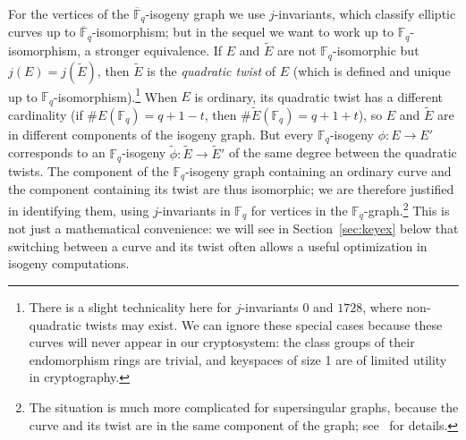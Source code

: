 \documentclass{llncs}
\newcommand{\F}{\mathbb{F}}
\newcommand{\Fbar}{\overline{\mathbb{F}}}
\begin{document}
For the vertices of the $\Fbar_q$-isogeny graph
we use $j$-invariants,
which classify elliptic curves up to
$\Fbar_q$-isomorphism;
but in the sequel we want to work up to $\F_q$-isomorphism,
a stronger equivalence.
If $E$ and $\tilde{E}$ are not $\F_q$-isomorphic
but $j(E) = j(\tilde{E})$,
then $\tilde{E}$ is the \emph{quadratic twist} of $E$
(which is defined and unique up to $\F_q$-isomorphism).\footnote{
    There is a slight technicality here for $j$-invariants $0$ and $1728$,
    where non-quadratic twists may exist.
    We can ignore these special cases
    because these curves will never appear in our cryptosystem:
    the class groups of their endomorphism rings are trivial,
    and keyspaces of size 1 are of limited utility in cryptography.
}
When $E$ is ordinary,
its quadratic twist has a different cardinality
(if $\#E(\F_q) = q + 1 - t$, then $\#\tilde{E}(\F_q) = q + 1 + t$),
so $E$ and $\tilde{E}$ are in different components of the isogeny graph.
But every $\F_q$-isogeny $\phi: E \to E'$ 
corresponds to an $\F_q$-isogeny $\tilde{\phi}: \tilde{E} \to \tilde{E}'$
of the same degree between the quadratic twists.
The component of the $\F_q$-isogeny graph containing an ordinary curve 
and the component containing its twist are thus isomorphic;
we are therefore justified in identifying them,
using $j$-invariants in $\F_q$ for vertices in the $\F_q$-graph.\footnote{
    The situation is much more complicated for supersingular graphs,
    because the curve and its twist are in the same component
    of the graph; see~\cite[\S2]{DelfsG16} for details.
}
This is not just a mathematical convenience:
we will see in Section~\ref{sec:keyex} below 
that switching between a curve and its twist
often allows a useful optimization in isogeny computations.
\end{document}
